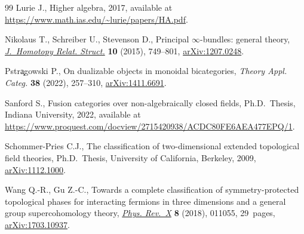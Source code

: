 \documentclass[pdftex]{sigma}
\numberwithin{equation}{section}
\begin{document}
\begin{thebibliography}{99}
Lurie J., Higher algebra, 2017, available at
 \url{https://www.math.ias.edu/~lurie/papers/HA.pdf}.

Nikolaus T., Schreiber U., Stevenson D., Principal {$\infty$}-bundles: general
 theory, \href{https://doi.org/10.1007/s40062-014-0083-6}{\textit{J.~Homotopy Relat. Struct.}} \textbf{10} (2015), 749--801,
 \href{https://arxiv.org/abs/1207.0248}{arXiv:1207.0248}.

Pstr\c{a}gowski P., On dualizable objects in monoidal bicategories,
 \textit{Theory Appl. Categ.} \textbf{38} (2022), 257--310,
 \href{https://arxiv.org/abs/1411.6691}{arXiv:1411.6691}.

Sanford S., Fusion categories over non-algebraically closed fields, Ph.D.~Thesis, {I}ndiana {U}niversity, 2022, available at
 \url{https://www.proquest.com/docview/2715420938/ACDC80FE6AEA477EPQ/1}.

Schommer-Pries C.J., The classification of two-dimensional extended topological
 field theories, Ph.D.~Thesis, {U}niversity of California, Berkeley, 2009,
 \href{https://arxiv.org/abs/1112.1000}{arXiv:1112.1000}.

Wang Q.-R., Gu Z.-C., Towards a complete classification of symmetry-protected
 topological phases for interacting fermions in three dimensions and a general
 group supercohomology theory, \href{https://doi.org/10.1103/PhysRevX.8.011055}{\textit{Phys. Rev.~X}} \textbf{8} (2018),
 011055, 29~pages, \href{https://arxiv.org/abs/1703.10937}{arXiv:1703.10937}.

\end{thebibliography}\LastPageEnding
\end{document}
